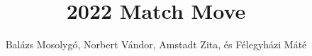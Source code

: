 \documentclass[runningheads]{llncs}
\begin{document}
\title{2022 Match Move}


\author{Balázs Mosolygó, Norbert Vándor, Amstadt Zita, és Félegyházi Máté}






\maketitle






\end{document}
